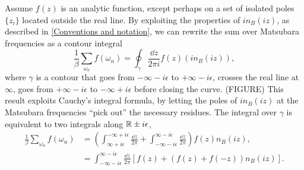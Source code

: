 Assume $f(z)$ is an analytic function, except perhaps on a set of isolated poles $\{z_i\}$ located outside the real line. 
By exploiting the properties of $i n_B(i z)$, as described in \autoref{Conventions and notation}, we can rewrite the sum over Matsubara frequencies as a contour integral
\begin{equation*}
    \frac{1}{\beta} \sum_{\omega_n} f(\omega_n) 
    = \oint_\gamma \frac{\dd z}{2 \pi i} f(z) (i n_B(i z)),
\end{equation*}
where $\gamma$ is a contour that goes from $- \infty - i \epsilon$ to $+ \infty - i \epsilon$, crosses the real line at $\infty$, goes from $+ \infty - i \epsilon$ to $- \infty + i \epsilon$ before closing the curve. (FIGURE)
This result exploits Cauchy's integral formula, by letting the poles of $in_B(iz)$ at the Matsubara frequencies ``pick out'' the necessary residues.
The integral over $\gamma$ is equivalent to two integrals along $\mathbb{R} \pm i \epsilon$,
\begin{align*}
    \frac{1}{\beta} \sum_{\omega_n} f(\omega_n) 
    &= \left(
        \int_{\infty + i \epsilon}^{-\infty + i \epsilon} \frac{\dd z}{2 \pi} 
        + \int_{-\infty - i \epsilon}^{\infty - i \epsilon}\frac{\dd z}{2 \pi}
    \right) 
    f(z) n_B(i z),
    \\
    & = \int_{-\infty - i \epsilon}^{\infty - i \epsilon}\frac{\dd z}{2 \pi}
    \left[
        f(z) + \left(f(z) + f(-z)\right) n_B(iz)
    \right].
\end{align*}
